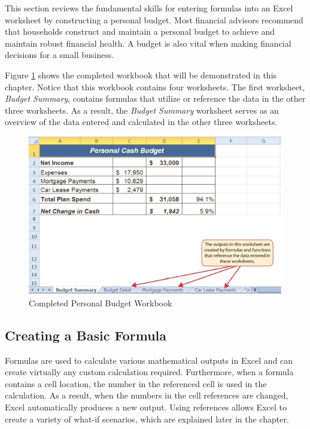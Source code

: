 This section reviews the fundamental skills for entering formulas into an Excel worksheet by constructing a personal budget. Most financial advisors recommend that households construct and maintain a personal budget to achieve and maintain robust financial health. A budget is also vital when making financial decisions for a small business.

Figure \ref{02:fig01} shows the completed workbook that will be demonstrated in this chapter. Notice that this workbook contains four worksheets. The first worksheet, \textit{Budget Summary}, contains formulas that utilize or reference the data in the other three worksheets. As a result, the \textit{Budget Summary} worksheet serves as an overview of the data entered and calculated in the other three worksheets.

\begin{figure}[H]
	\centering
	\includegraphics[width=\maxwidth{.95\linewidth}]{gfx/ch02_fig01}
	\caption{Completed Personal Budget Workbook}
	\label{02:fig01}
\end{figure}

\subsection{Creating a Basic Formula}

Formulas are used to calculate various mathematical outputs in Excel and can create virtually any custom calculation required. Furthermore, when a formula contains a cell location, the number in the referenced cell is used in the calculation. As a result, when the numbers in the cell references are changed, Excel automatically produces a new output. Using references allows Excel to create a variety of what-if scenarios, which are explained later in the chapter.


